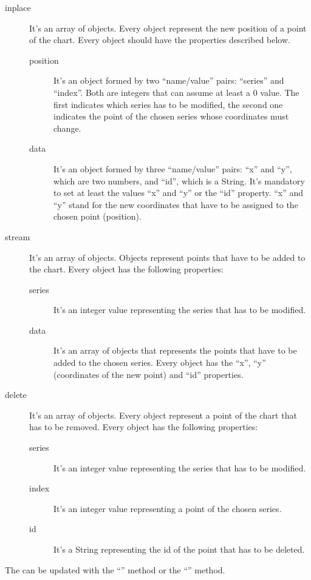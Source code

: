 				\begin{description}
					\item[inplace] It's an array of objects. Every object represent the new position of a point of the chart. Every object should have the properties described below.
					\begin{description}
						\item[position] It's an object formed by two “name/value” pairs: “series” and “index”. Both are integers that can assume at least a 0 value. The first indicates which series has to be modified, the second one indicates the point of the chosen series whose coordinates must change. 
						\item[data] It's an object formed by three “name/value” pairs: “x” and “y”, which are two numbers, and “id”, which is a String. It's mandatory to set at least the values “x” and “y” or the “id” property. “x” and “y” stand for the new coordinates that have to be assigned to the chosen point (position).
					\end{description}
					\item[stream] It's an array of objects. Objects represent points that have to be added to the chart. Every object has the following properties:
					\begin{description}
						\item[series] It's an integer value representing the series that has to be modified.
						\item[data] It's an array of objects that represents the points that have to be added to the chosen series. Every object has the “x”, “y” (coordinates of the new point) and “id” properties.
					\end{description}
					\item[delete] It's an array of objects. Every object represent a point of the chart that has to be removed. Every object has the following properties:
					\begin{description}
						\item[series] It's an integer value representing the series that has to be modified.
						\item[index] It's an integer value representing a point of the chosen series.
						\item[id] It's a String representing the id of the point that has to be deleted.
					\end{description}
				\end{description}
				The  can be updated with the “” method or the “” method.\\
